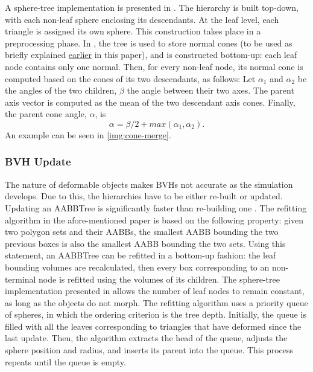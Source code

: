A sphere-tree implementation is presented in \citep{rtsd01}. The hierarchy is built top-down, with each non-leaf sphere enclosing its descendants. At the leaf level, each triangle is assigned its own sphere. This construction takes place in a preprocessing phase. In \citep{provot97}, the tree is used to store normal cones (to be used as briefly explained \hyperref[lab:ncones]{earlier}  in this paper), and is constructed bottom-up: each leaf node contains only one normal. Then, for every non-leaf node, its normal cone is computed based on the cones of its two descendants, as follows: Let $\alpha_{1}$ and $\alpha_{2}$ be the angles of the two children, $\beta$ the angle between their two axes. The parent axis vector is computed as the mean of the two descendant axis cones. Finally, the parent cone angle, $\alpha$, is \[\alpha = \beta / 2 + max(\alpha_{1}, \alpha_{2}).\] An example can be seen in \autoref{img:cone-merge}.


\subsubsection{BVH Update}
\label{sub-sub-sec:bvhupdate}

The nature of deformable objects makes BVHs not accurate as the simulation develops. Due to this, the hierarchies have to be either re-built or updated. Updating an AABBTree is significantly faster than re-building one \citep{vdb97}. The refitting algorithm in the afore-mentioned paper is based on the following property: given two polygon sets and their AABBs, the smallest AABB bounding the two previous boxes is also the smallest AABB bounding the two sets. Using this statement, an AABBTree can be refitted in a bottom-up fashion: the leaf bounding volumes are recalculated, then every box corresponding to an non-terminal node is refitted using the volumes of its children. The sphere-tree implementation presented in \citep{rtsd01} allows the number of leaf nodes to remain constant, as long as the objects do not morph. The refitting algorithm uses a priority queue of spheres, in which the ordering criterion is the tree depth. Initially, the queue is filled with all the leaves corresponding to triangles that have deformed since the last update. Then, the algorithm extracts the head of the queue, adjusts the sphere position and radius, and inserts its parent into the queue. This process repeats until the queue is empty.

